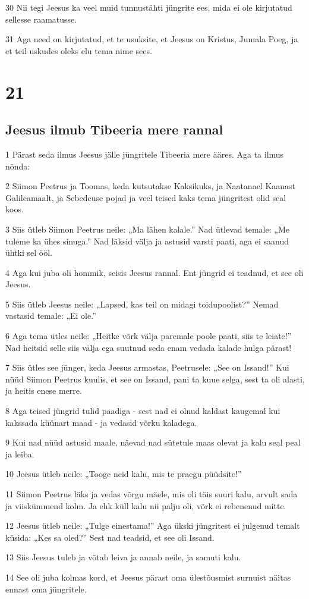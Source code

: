 \par 30 Nii tegi Jeesus ka veel muid tunnustähti jüngrite ees, mida ei ole kirjutatud sellesse raamatusse.
\par 31 Aga need on kirjutatud, et te usuksite, et Jeesus on Kristus, Jumala Poeg, ja et teil uskudes oleks elu tema nime sees.


\chapter{21}

\section*{Jeesus ilmub Tibeeria mere rannal}

\par 1 Pärast seda ilmus Jeesus jälle jüngritele Tibeeria mere ääres. Aga ta ilmus nõnda:
\par 2 Siimon Peetrus ja Toomas, keda kutsutakse Kaksikuks, ja Naatanael Kaanast Galileamaalt, ja Sebedeuse pojad ja veel teised kaks tema jüngritest olid seal koos.
\par 3 Siis ütleb Siimon Peetrus neile: „Ma lähen kalale.” Nad ütlevad temale: „Me tuleme ka ühes sinuga.” Nad läksid välja ja astusid varsti paati, aga ei saanud ühtki sel ööl.
\par 4 Aga kui juba oli hommik, seisis Jeesus rannal. Ent jüngrid ei teadnud, et see oli Jeesus.
\par 5 Siis ütleb Jeesus neile: „Lapsed, kas teil on midagi toidupoolist?” Nemad vastasid temale: „Ei ole.”
\par 6 Aga tema ütles neile: „Heitke võrk välja paremale poole paati, siis te leiate!” Nad heitsid selle siis välja ega suutnud seda enam vedada kalade hulga pärast!
\par 7 Siis ütles see jünger, keda Jeesus armastas, Peetrusele: „See on Issand!” Kui nüüd Siimon Peetrus kuulis, et see on Issand, pani ta kuue selga, sest ta oli alasti, ja heitis enese merre.
\par 8 Aga teised jüngrid tulid paadiga - sest nad ei olnud kaldast kaugemal kui kakssada küünart maad - ja vedasid võrku kaladega.
\par 9 Kui nad nüüd astusid maale, näevad nad sütetule maas olevat ja kalu seal peal ja leiba.
\par 10 Jeesus ütleb neile: „Tooge neid kalu, mis te praegu püüdsite!”
\par 11 Siimon Peetrus läks ja vedas võrgu mäele, mis oli täis suuri kalu, arvult sada ja viiskümmend kolm. Ja ehk küll kalu nii palju oli, võrk ei rebenenud mitte.
\par 12 Jeesus ütleb neile: „Tulge einestama!” Aga ükski jüngritest ei julgenud temalt küsida: „Kes sa oled?” Sest nad teadsid, et see oli Issand.
\par 13 Siis Jeesus tuleb ja võtab leiva ja annab neile, ja samuti kalu.
\par 14 See oli juba kolmas kord, et Jeesus pärast oma ülestõusmist surnuist näitas ennast oma jüngritele.

